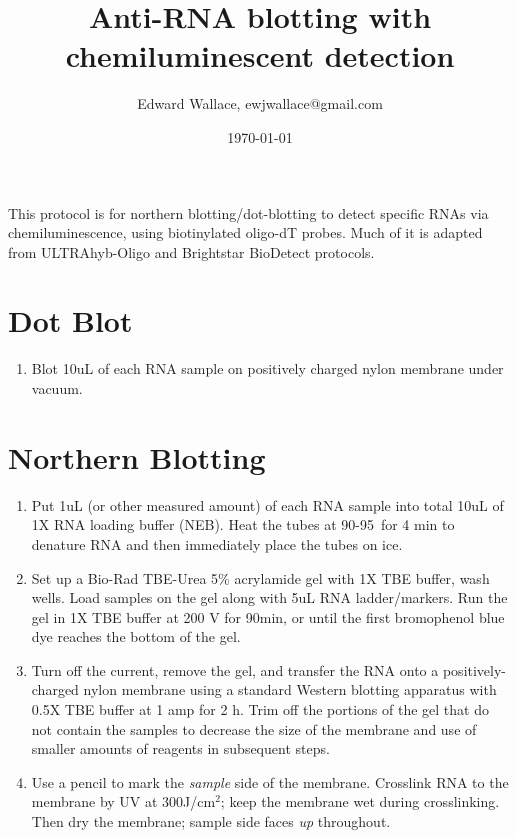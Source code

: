 \documentclass{article}
\begin{document}
\title{\vspace{-.75in} Anti-RNA blotting with chemiluminescent detection}
\author{Edward Wallace, ewjwallace@gmail.com}
\date{\today}
\maketitle


This protocol is for northern blotting/dot-blotting to detect specific RNAs via chemiluminescence, using biotinylated oligo-dT probes.
Much of it is adapted from ULTRAhyb-Oligo and Brightstar BioDetect protocols.


\section*{Dot Blot}

\begin{enumerate}
\item Blot 10uL of each RNA sample on positively charged nylon membrane under vacuum.
\end{enumerate}

\section*{Northern Blotting}
\begin{enumerate}
\item Put 1uL (or other measured amount) of each RNA sample into total 10uL of 1X RNA loading buffer (NEB). Heat the tubes at 90-95\celsius\  for 4 min to denature RNA and then immediately place the tubes on ice. 
\item Set up a Bio-Rad TBE-Urea 5\% acrylamide gel with 1X TBE buffer, wash wells. Load samples on the gel along with 5uL RNA ladder/markers. Run the gel in 1X TBE buffer at 200 V for 90min, or until the first bromophenol blue dye reaches the bottom of the gel. 
\item Turn off the current, remove the gel, and transfer the RNA onto a positively-charged nylon membrane using a standard Western blotting apparatus with 0.5X TBE buffer at 1 amp for 2 h. Trim off the portions of the gel that do not contain the samples to decrease the size of the membrane and use of smaller amounts of reagents in subsequent steps.
\item Use a pencil to mark the \emph{sample} side of the membrane. Crosslink RNA to the membrane by UV at  300J/cm$^2$; keep the membrane wet during crosslinking. Then dry the membrane; sample side faces \emph{up} throughout.
\end{enumerate}
\end{document}
